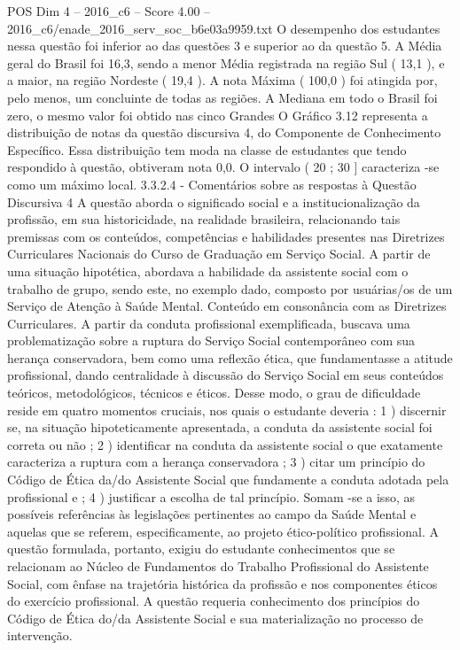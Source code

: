 \begin{textsample}{POS Dim 4 – 2016\_c6 – Score 4.00 – 2016\_c6/enade\_2016\_serv\_soc\_b6e03a9959.txt}
O desempenho dos estudantes nessa questão foi inferior ao das questões 3 e superior ao da questão 5.
A Média geral do Brasil foi 16,3, sendo a menor Média registrada na região Sul ( 13,1 ), e a maior, na região Nordeste ( 19,4 ).
A nota Máxima ( 100,0 ) foi atingida por, pelo menos, um concluinte de todas as regiões.
A Mediana em todo o Brasil foi zero, o mesmo valor foi obtido nas cinco Grandes O Gráfico 3.12 representa a distribuição de notas da questão discursiva 4, do Componente de Conhecimento Específico.
Essa distribuição tem moda na classe de estudantes que tendo respondido à questão, obtiveram nota 0,0.
O intervalo ( 20 ; 30 ] caracteriza -se como um máximo local. 3.3.2.4 - Comentários sobre as respostas à Questão Discursiva 4 A questão aborda o significado social e a institucionalização da profissão, em sua historicidade, na realidade brasileira, relacionando tais premissas com os conteúdos, competências e habilidades presentes nas Diretrizes Curriculares Nacionais do Curso de Graduação em Serviço Social.
A partir de uma situação hipotética, abordava a habilidade da assistente social com o trabalho de grupo, sendo este, no exemplo dado, composto por usuárias/os de um Serviço de Atenção à Saúde Mental.
Conteúdo em consonância com as Diretrizes Curriculares.
A partir da conduta profissional exemplificada, buscava uma problematização sobre a ruptura do Serviço Social contemporâneo com sua herança conservadora, bem como uma reflexão ética, que fundamentasse a atitude profissional, dando centralidade à discussão do Serviço Social em seus conteúdos teóricos, metodológicos, técnicos e éticos.
Desse modo, o grau de dificuldade reside em quatro momentos cruciais, nos quais o estudante deveria : 1 ) discernir se, na situação hipoteticamente apresentada, a conduta da assistente social foi correta ou não ; 2 ) identificar na conduta da assistente social o que exatamente caracteriza a ruptura com a herança conservadora ; 3 ) citar um princípio do Código de Ética da/do Assistente Social que fundamente a conduta adotada pela profissional e ; 4 ) justificar a escolha de tal princípio.
Somam -se a isso, as possíveis referências às legislações pertinentes ao campo da Saúde Mental e aquelas que se referem, especificamente, ao projeto ético-político profissional.
A questão formulada, portanto, exigiu do estudante conhecimentos que se relacionam ao Núcleo de Fundamentos do Trabalho Profissional do Assistente Social, com ênfase na trajetória histórica da profissão e nos componentes éticos do exercício profissional.
A questão requeria conhecimento dos princípios do Código de Ética do/da Assistente Social e sua materialização no processo de intervenção.

\end{textsample}
